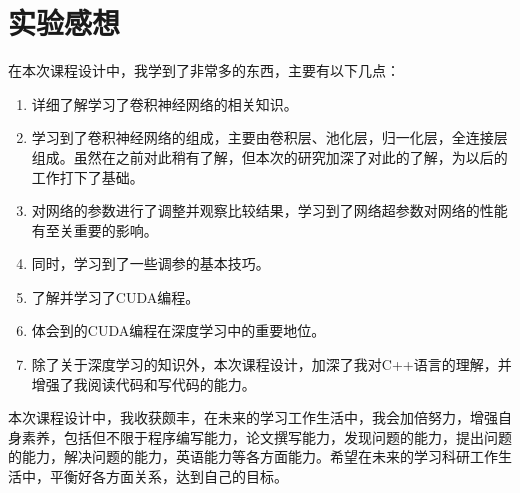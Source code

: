 \section{实验感想}


在本次课程设计中，我学到了非常多的东西，主要有以下几点：
\begin{enumerate}
    \item 详细了解学习了卷积神经网络的相关知识。
    \item 学习到了卷积神经网络的组成，主要由卷积层、池化层，归一化层，全连接层组成。虽然在之前对此稍有了解，但本次的研究加深了对此的了解，为以后的工作打下了基础。
    \item 对网络的参数进行了调整并观察比较结果，学习到了网络超参数对网络的性能有至关重要的影响。
    \item 同时，学习到了一些调参的基本技巧。
    \item 了解并学习了CUDA编程。
    \item 体会到的CUDA编程在深度学习中的重要地位。
    \item 除了关于深度学习的知识外，本次课程设计，加深了我对C++语言的理解，并增强了我阅读代码和写代码的能力。
    

\end{enumerate}

本次课程设计中，我收获颇丰，在未来的学习工作生活中，我会加倍努力，增强自身素养，包括但不限于程序编写能力，论文撰写能力，发现问题的能力，提出问题的能力，解决问题的能力，英语能力等各方面能力。希望在未来的学习科研工作生活中，平衡好各方面关系，达到自己的目标。
